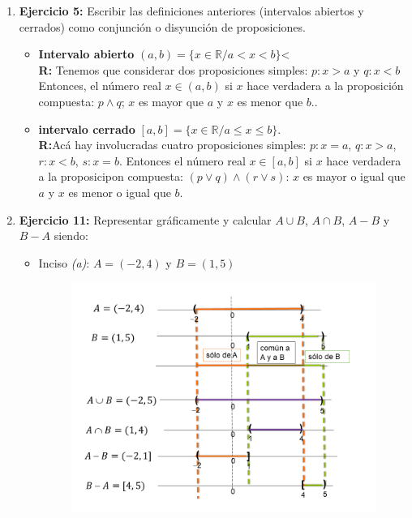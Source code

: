 \documentclass[12pt]{article}
\theoremstyle{definition}
\begin{document}
\begin{enumerate}
\item  \textbf{Ejercicio 5:}  Escribir las definiciones anteriores (intervalos abiertos y cerrados) como conjunción o disyunción de proposiciones.
\begin{itemize}
\setlength\itemsep{0em}
\item \textbf{Intervalo abierto} $(a,b) = \{x \in \mathbb{R}/ a < x < b\}$<\\
\textbf{R:} Tenemos que considerar dos proposiciones simples: $p: x > a$ y $q: x < b$ Entonces, el número real $x \in (a,b)$ si $x$ hace verdadera a la proposición compuesta: $p \wedge q$; $x$ es mayor que $a$ y $x$ es menor que $b$.. 
\item \textbf{intervalo cerrado} $[a,b] = \{x \in \mathbb{R}/ a \leq x \leq b\}$. \\
\textbf{R:}Acá hay involucradas cuatro proposiciones simples: $p: x =a$, $q: x >a$, $r: x < b$, $s: x = b$.  Entonces el número real $x \in [a,b]$ si $x$ hace verdadera a la proposicipon compuesta: $(p \vee q) \wedge (r\vee s)$: $x$ es mayor o igual que $a$ y $x$ es menor o igual que $b$.
\end{itemize}

\item  \textbf{Ejercicio 11: }Representar gráficamente y calcular $A \cup B$, $A\cap B$, $A-B$ y $B-A$ siendo:
\begin{itemize}
\setlength\itemsep{0em}
\item  Inciso \textit{(a)}: $A = (-2, 4)$ y $B = (1,5)$
\begin{figure}[H]
\centering
\includegraphics[width=1\textwidth]{11-1.png}
\end{figure}


\end{itemize}
\end{enumerate}
\end{document}
